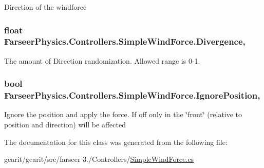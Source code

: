 Direction of the windforce 

\hypertarget{class_farseer_physics_1_1_controllers_1_1_simple_wind_force_a292d13f027c27324198e6c41cf6fb5e8}{
\subsubsection[{Divergence}]{\setlength{\rightskip}{0pt plus 5cm}float Farseer\+Physics.\+Controllers.\+Simple\+Wind\+Force.\+Divergence\hspace{0.3cm}{\ttfamily [get]}, {\ttfamily [set]}}}\label{class_farseer_physics_1_1_controllers_1_1_simple_wind_force_a292d13f027c27324198e6c41cf6fb5e8}


The amount of Direction randomization. Allowed range is 0-\/1. 

\hypertarget{class_farseer_physics_1_1_controllers_1_1_simple_wind_force_ab81eaaca5b969766697c187fff14ad8c}{
\subsubsection[{Ignore\+Position}]{\setlength{\rightskip}{0pt plus 5cm}bool Farseer\+Physics.\+Controllers.\+Simple\+Wind\+Force.\+Ignore\+Position\hspace{0.3cm}{\ttfamily [get]}, {\ttfamily [set]}}}\label{class_farseer_physics_1_1_controllers_1_1_simple_wind_force_ab81eaaca5b969766697c187fff14ad8c}


Ignore the position and apply the force. If off only in the \char`\"{}front\char`\"{} (relative to position and direction) will be affected 



The documentation for this class was generated from the following file\+:\begin{DoxyCompactItemize}
\item 
gearit/gearit/src/farseer 3./\+Controllers/\hyperlink{_simple_wind_force_8cs}{Simple\+Wind\+Force.\+cs}\end{DoxyCompactItemize}
